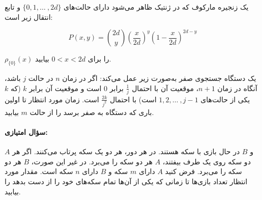 \documentclass[11pt, a4, twoside]{article}
\begin{document}
	\begin{problem} %
    یک زنجیره مارکوف که در ژنتیک ظاهر می‌شود دارای حالت‌های $\{0, 1, \dots\ , 2d\}$ و تابع انتقال زیر است:
    
    \[
    P(x,y) = \binom{2d}{y}\left(\frac{x}{2d}\right)^y\left(1 - \frac{x}{2d}\right)^{2d-y}
    \]
    
    $\rho_{\{0\}}(x)$ را برای $0 < x < 2d$ بیابید.

	\end{problem}

	\begin{problem} %
    یک دستگاه جستجوی صفر به‌صورت زیر عمل می‌کند: اگر در زمان $n$ در حالت $j$ باشد، آنگاه در زمان $n + 1$، موقعیت آن با احتمال $\frac{1}{j}$ برابر $0$ است و موقعیت آن برابر $k$ (که $k$ یکی از حالت‌های $1, 2, \dots\ , j - 1$ است) با احتمال $\frac{2k}{j^2}$ است. زمان مورد انتظار تا اولین باری که دستگاه به صفر برسد را از حالت $m$ بیابید.
	\end{problem}

\paragraph{\textbf{سؤال امتیازی:}} $A$ و $B$ در حال بازی با سکه هستند. در هر دور، هر دو یک سکه پرتاب می‌کنند. اگر هر دو سکه روی یک طرف بیفتند، $A$ هر دو سکه را می‌برد. در غیر این صورت، $B$ هر دو سکه را می‌برد. فرض کنید $A$ دارای $m$ سکه و $B$ دارای $n$ سکه است. مقدار مورد انتظار تعداد بازی‌ها تا زمانی که یکی از آن‌ها تمام سکه‌های خود را از دست بدهد را بیابید.
\end{document}
